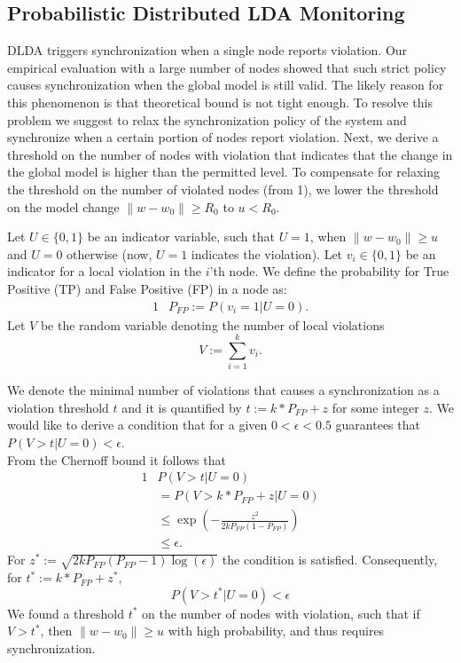 \documentclass{sig-alternate-05-2015}
\begin{document}
\subsection{Probabilistic Distributed LDA Monitoring}\label{sec:PDLDA}

DLDA triggers synchronization when a single node reports violation.
Our empirical evaluation with a large number of nodes showed that such strict
policy causes synchronization when the global model is still valid. The likely
reason for this phenomenon is that theoretical bound is not tight enough. 
To resolve this problem we suggest to relax the synchronization policy of 
the system and synchronize when a certain portion of nodes report violation. 
Next, we derive a threshold on the number of nodes with violation that indicates 
that the change in the global model is higher than the permitted level. 
To compensate for relaxing the threshold on the number of violated nodes
(from 1), we lower the threshold on the model change $\|w-w_0\| \geq R_0$  
to $u<R_0$.

Let $U\in\{0,1\}$ be an indicator variable, such that $U=1$, 
when $\|w-w_0\| \geq u$ and $U=0$ otherwise (now, $U=1$ indicates the violation).
Let $v_i \in \{0,1\}$ be an indicator for a local violation in the
$i$'th node. We define the probability for True Positive (TP) and False Positive
(FP) in a node as:
\begin{alignat*}{1}
& P_{FP} := P(v_i=1 | U=0).
\end{alignat*}
Let $V$ be the random variable denoting the number of local violations
\begin{equation*}
V := \sum_{i=1}^k v_i.
\end{equation*}

We denote the minimal number of violations that causes a synchronization 
as a violation threshold $t$ and it is quantified by 
$t:=k*P_{FP}+z$ for some integer $z$.
We would like to derive a condition that for a given $0 < \epsilon < 0.5$ 
guarantees that
$P(V>t|U=0) < \epsilon$.
\\From the Chernoff bound it follows that
\begin{alignat*}{1}
& P(V>t | U=0) \\
& = P(V>k*P_{FP}+z | U=0) \\
& \leq \exp(-\frac{z^2}{2kP_{FP}(1-P_{FP})}) \\
& \leq \epsilon.
\end{alignat*}
For $z^*:=\sqrt{2kP_{FP}(P_{FP}-1)\log(\epsilon)}$ the condition is satisfied.
Consequently, for $t^*:=k*P_{FP}+z^*$,  $$P(V > t^*|U=0) <
\epsilon$$
We found a threshold $t^*$ on the number of nodes with violation, such that if $V > t^*$,  then
$\|w-w_0\| \geq u$ with high probability, and thus requires synchronization.
\end{document}
